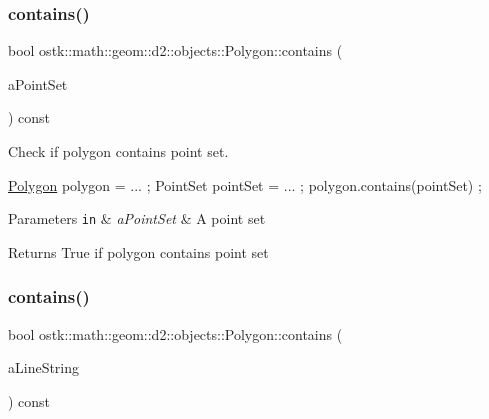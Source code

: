 \subsubsection{\texorpdfstring{contains()}{contains()}\hspace{0.1cm}{\footnotesize\ttfamily [2/3]}}
{\footnotesize\ttfamily bool ostk\+::math\+::geom\+::d2\+::objects\+::\+Polygon\+::contains (\begin{DoxyParamCaption}\item[{const \hyperlink{classostk_1_1math_1_1geom_1_1d2_1_1objects_1_1_point_set}{Point\+Set} \&}]{a\+Point\+Set }\end{DoxyParamCaption}) const}



Check if polygon contains point set. 


\begin{DoxyCode}
\hyperlink{classostk_1_1math_1_1geom_1_1d2_1_1objects_1_1_polygon_adaf9ef564754ab10ed3dd0d5fa0d90ea}{Polygon} polygon = ... ;
PointSet pointSet = ... ;
polygon.contains(pointSet) ;
\end{DoxyCode}



\begin{DoxyParams}[1]{Parameters}
\mbox{\tt in}  & {\em a\+Point\+Set} & A point set \\
\hline
\end{DoxyParams}
\begin{DoxyReturn}{Returns}
True if polygon contains point set 
\end{DoxyReturn}
\mbox{\label{classostk_1_1math_1_1geom_1_1d2_1_1objects_1_1_polygon_a203d0490d40b2a221f46194765e0435d}} 
\subsubsection{\texorpdfstring{contains()}{contains()}\hspace{0.1cm}{\footnotesize\ttfamily [3/3]}}
{\footnotesize\ttfamily bool ostk\+::math\+::geom\+::d2\+::objects\+::\+Polygon\+::contains (\begin{DoxyParamCaption}\item[{const \hyperlink{classostk_1_1math_1_1geom_1_1d2_1_1objects_1_1_line_string}{Line\+String} \&}]{a\+Line\+String }\end{DoxyParamCaption}) const}



